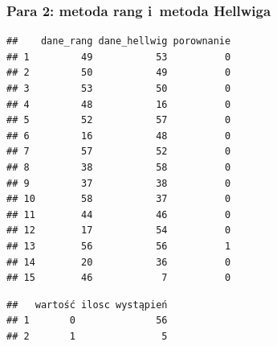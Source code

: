 \documentclass[12pt,a4paper]{report}
\begin{document}
{\subsubsection{Para 2: metoda rang i~metoda
Hellwiga}%
\begin{Shaded}
\begin{Highlighting}[]
\NormalTok{(}\NormalTok{,}\NormalTok{)}
\NormalTok{:}
\NormalTok{\{}
  \NormalTok{\{}
  \NormalTok{\}}
\NormalTok{\}}
\NormalTok{)}
\end{Highlighting}
\end{Shaded}%
\begin{verbatim}
##    dane_rang dane_hellwig porownanie
## 1         49           53          0
## 2         50           49          0
## 3         53           50          0
## 4         48           16          0
## 5         52           57          0
## 6         16           48          0
## 7         57           52          0
## 8         38           58          0
## 9         37           38          0
## 10        58           37          0
## 11        44           46          0
## 12        17           54          0
## 13        56           56          1
## 14        20           36          0
## 15        46            7          0
\end{verbatim}
\begin{Shaded}
\begin{Highlighting}[]
\NormalTok{(}
\NormalTok{(}\NormalTok{,}\NormalTok{)}
\end{Highlighting}
\end{Shaded}
\begin{verbatim}
##   wartość ilosc wystąpień
## 1       0              56
## 2       1               5
\end{verbatim}
}
\end{document}

